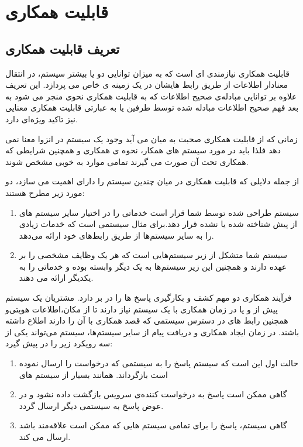 \chapter{قابلیت همکاری}
\section{تعریف قابلیت همکاری}
قابلیت همکاری  نیازمندی ای است که به میزان توانایی دو یا بیشتر سیستم، در انتقال معنادار اطلاعات از طریق رابط  هایشان در یک زمینه ی خاص می پردازد.
این تعریف علاوه بر توانایی مبادله‌ی صحیح اطلاعات که به قابلیت همکاری نحوی  منجر می شود به بعد فهم صحیح اطلاعات مبادله شده توسط طرفین یا به عبارتی قابلیت همکاری معنایی  نیز تاکید ویژه‌ای دارد.

زمانی که از قابلیت همکاری صحبت به میان می آید وجود یک سیستم در انزوا معنا نمی دهد فلذا باید در مورد سیستم های همکار، نحوه ی همکاری و همچنین شرایطی که همکاری تحت آن صورت می گیرند تمامی موارد به خوبی مشخص شوند.

از جمله دلایلی که قابلیت همکاری در میان چندین سیستم را دارای اهمیت می سازد،‌ دو مورد زیر مطرح هستند:
\begin{enumerate}
\item
سیستم طراحی شده توسط شما قرار است خدماتی را در اختیار سایر سیستم های از پیش شناخته شده یا نشده قرار دهد.برای مثال  سیستمی است که خدمات زیادی را به سایر سیستم‌ها از طریق رابط‌های خود ارائه می‌دهد.
\item
سیستم شما متشکل از زیر سیستم‌هایی است که هر یک وظایف مشخصی را بر عهده دارند و همچنین این زیر سیستم‌ها به یک دیگر وابسته بوده و خدماتی را به یکدیگر ارائه می دهند.
\end{enumerate}

فرآیند همکاری دو مهم کشف و بکارگیری پاسخ ها  را در بر دارد. مشتریان یک سیستم پیش از و یا در زمان همکاری با یک سیستم نیاز دارند تا از مکان‌،اطلاعات هویتی‌و همچنین رابط های در دسترس سیستمی که قصد همکاری با آن را دارند اطلاع داشته باشند. در زمان ایجاد همکاری و دریافت پیام از سایر سیستم‌ها، سیستم می‌تواند یکی از سه رویکرد زیر را در پیش گیرد:
\begin{enumerate}
\item
حالت اول این است که سیستم پاسخ را به سیستمی که درخواست را ارسال نموده است بازگرداند. همانند بسیار از سیستم های 
\item
گاهی ممکن است پاسخ به درخواست کننده‌ی سرویس بازگشت داده نشود و در عوض پاسخ به سیستمی دیگر ارسال گردد.
\item
گاهی سیستم، پاسخ را برای تمامی سیستم هایی که ممکن است علاقه‌مند باشد ارسال می کند.
\end{enumerate}

